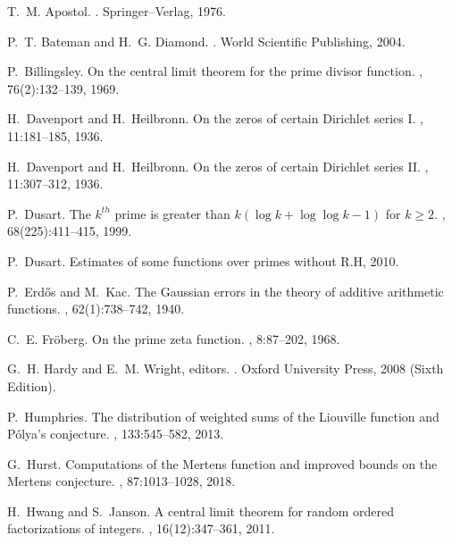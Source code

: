 \documentclass[11pt,reqno,a4letter]{article}
\numberwithin{figure}{section}
\numberwithin{table}{section}
\theoremstyle{plain}
\numberwithin{theorem}{section}
\theoremstyle{definition}
\begin{document}
\begin{thebibliography}{10}

T.~M. Apostol.
.
\newblock Springer--Verlag, 1976.

P.~T. Bateman and H.~G. Diamond.
.
\newblock World Scientific Publishing, 2004.

P.~Billingsley.
\newblock On the central limit theorem for the prime divisor function.
, 76(2):132--139, 1969.

H.~Davenport and H.~Heilbronn.
\newblock On the zeros of certain {D}irichlet series {I}.
, 11:181--185, 1936.

H.~Davenport and H.~Heilbronn.
\newblock On the zeros of certain {D}irichlet series {II}.
, 11:307--312, 1936.

P.~Dusart.
\newblock The $k^{th}$ prime is greater than $k(\log k +\log\log k-1)$ for $k
  \geq 2$.
, 68(225):411--415, 1999.

P.~Dusart.
\newblock Estimates of some functions over primes without {R}.{H}, 2010.

P.~Erd{\H{o}}s and M.~Kac.
\newblock The {G}aussian errors in the theory of additive arithmetic functions.
, 62(1):738--742, 1940.

C.~E. Fr{\"{o}}berg.
\newblock On the prime zeta function.
, 8:87--202, 1968.

G.~H. Hardy and E.~M. Wright, editors.
.
\newblock Oxford University Press, 2008 (Sixth Edition).

P.~Humphries.
\newblock The distribution of weighted sums of the {L}iouville function and
  {P}\'{o}lya's conjecture.
, 133:545--582, 2013.

G.~Hurst.
\newblock Computations of the {M}ertens function and improved bounds on the
  {M}ertens conjecture.
, 87:1013--1028, 2018.

H.~Hwang and S.~Janson.
\newblock A central limit theorem for random ordered factorizations of
  integers.
, 16(12):347--361, 2011.


\end{thebibliography}
\end{document}

